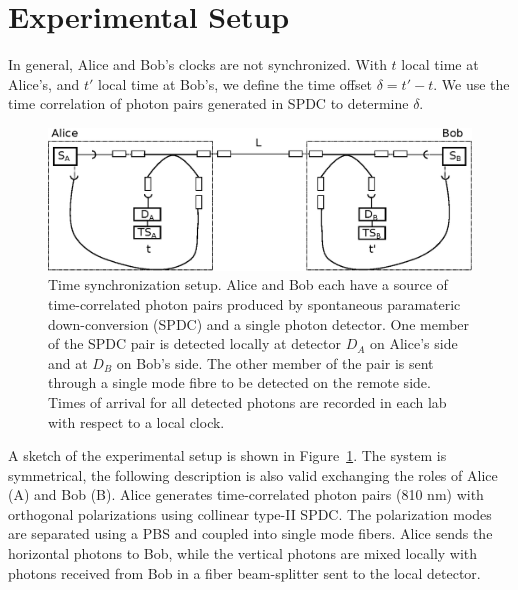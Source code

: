 \documentclass[aps,pra,onecolumn, superscriptaddress]{revtex4}
\begin{document}
\section{Experimental Setup}
      
In general, Alice and Bob's clocks are not synchronized.
With $t$ local time at Alice's, and $ t'$ local time at Bob's,
we define the time offset $\delta = t' - t$.
We use the time correlation of photon pairs generated in SPDC to determine $\delta$.

\begin{figure}[htbp]
  \centering
  \includegraphics[width=16cm]{figures/setup_simplified.eps}
  \caption{\label{fig:setup}
  Time synchronization setup. Alice and Bob each have a source of time-correlated photon pairs produced by spontaneous paramateric down-conversion (SPDC) and a single photon detector. One member of the SPDC pair is detected locally at detector $D_A$ on Alice's side and at $D_B$ on Bob's side. The other member of the pair is sent through a single mode fibre to be detected on the remote side. Times of arrival for all detected photons are recorded in each lab with respect to a local clock. 
  }
\end{figure}

A sketch of the experimental setup is shown in Figure~\ref{fig:setup}.
The system is symmetrical, the following description is also valid exchanging the roles of Alice (A) and Bob (B).
Alice generates time-correlated photon pairs (810 nm) with orthogonal polarizations using collinear type-II SPDC. The polarization modes are separated using a PBS and coupled into single mode fibers.
Alice sends the horizontal photons to Bob,
while the
vertical photons are mixed locally with photons received from Bob in a fiber beam-splitter sent to the local detector.
\end{document}
